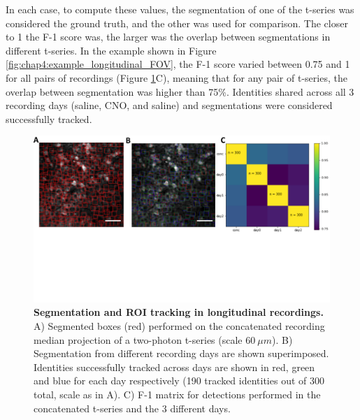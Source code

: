 In each case, to compute these values, the segmentation of one of the t-series was considered the ground truth, and the other was used for comparison. 
The closer to 1 the F-1 score was, the larger was the overlap between segmentations in different t-series.
In the example shown in Figure \ref{fig:chap4:example_longitudinal_FOV}, the F-1 score varied between 0.75 and 1 for all pairs of recordings (Figure \ref{fig:chap4:segmentation_long}C), meaning that for any pair of t-series, the overlap between segmentation was higher than 75\%.
Identities shared across all 3 recording days (saline, CNO, and saline) and segmentations were considered successfully tracked.
\begin{figure}
    \centering
    \includegraphics[trim={0 230 0 0},clip,width=\textwidth]{Figures/Chapter4/segmentation_long.pdf}
    \caption[Segmentation and ROI tracking in longitudinal recordings]{\textbf{Segmentation and ROI tracking in longitudinal recordings.} 
    A) Segmented boxes (red) performed on the concatenated recording median projection of a two-photon t-series (scale $60\ \mu m$). 
    B) Segmentation from different recording days are shown superimposed. Identities successfully tracked across days are shown in red, green and blue for each day respectively (190 tracked identities out of 300 total, scale as in A). 
    C) F-1 matrix for detections performed in the concatenated t-series and the 3 different days.}
    \label{fig:chap4:segmentation_long}
\end{figure}

